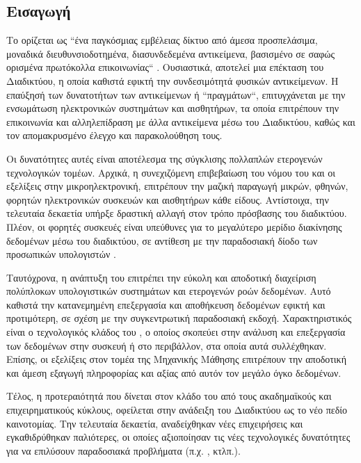 \subsection{Εισαγωγή}
Το  ορίζεται ως ``ένα παγκόσμιας εμβέλειας δίκτυο από άμεσα προσπελάσιμα, μοναδικά διευθυνσιοδοτημένα, διασυνδεδεμένα αντικείμενα, βασισμένο σε σαφώς ορισμένα πρωτόκολλα επικοινωνίας`` \cite{ATZORI20102787}.
Ουσιαστικά, αποτελεί μια επέκταση του Διαδικτύου, η οποία καθιστά εφικτή την συνδεσιμότητά φυσικών αντικείμενων.
Η επαύξησή των δυνατοτήτων των αντικείμενων ή ``πραγμάτων``, επιτυγχάνεται με την ενσωμάτωση ηλεκτρονικών συστημάτων και αισθητήρων, τα οποία επιτρέπουν την επικοινωνία και αλληλεπίδραση με άλλα αντικείμενα μέσω του Διαδικτύου, καθώς και τον απομακρυσμένο έλεγχο και παρακολούθηση τους.
\par
Οι δυνατότητες αυτές είναι αποτέλεσμα της σύγκλισης πολλαπλών ετερογενών τεχνολογικών τομέων.
Αρχικά, η συνεχιζόμενη επιβεβαίωση του νόμου του  και οι εξελίξεις στην μικροηλεκτρονική, επιτρέπουν την μαζική παραγωγή μικρών, φθηνών, φορητών ηλεκτρονικών συσκευών και αισθητήρων κάθε είδους.
Αντίστοιχα, την τελευταία δεκαετία υπήρξε δραστική αλλαγή στον τρόπο πρόσβασης του διαδικτύου.
Πλέον, οι φορητές συσκευές είναι υπεύθυνες για το μεγαλύτερο μερίδιο διακίνησης δεδομένων μέσω του διαδικτύου, σε αντίθεση με την παραδοσιακή δίοδο των προσωπικών υπολογιστών \cite{cisco2019}.
\par
Ταυτόχρονα, η ανάπτυξη του  επιτρέπει την εύκολη και αποδοτική διαχείριση πολύπλοκων υπολογιστικών συστημάτων και ετερογενών ροών δεδομένων.
Αυτό καθιστά την κατανεμημένη επεξεργασία και αποθήκευση δεδομένων εφικτή και προτιμότερη, σε σχέση με την συγκεντρωτική παραδοσιακή εκδοχή.
Χαρακτηριστικός είναι ο τεχνολογικός κλάδος του , ο οποίος σκοπεύει στην ανάλυση και επεξεργασία των δεδομένων στην συσκευή ή στο περιβάλλον, στα οποία αυτά συλλέχθηκαν.
Επίσης, οι εξελίξεις στον τομέα της Μηχανικής Μάθησης επιτρέπουν την αποδοτική και άμεση εξαγωγή πληροφορίας και αξίας από αυτόν τον μεγάλο όγκο δεδομένων.
\par
Τέλος, η προτεραιότητά που δίνεται στον κλάδο του  από τους ακαδημαϊκούς και επιχειρηματικούς κύκλους, οφείλεται στην ανάδειξη του Διαδικτύου ως το νέο πεδίο καινοτομίας.
Την τελευταία δεκαετία, αναδείχθηκαν νέες επιχειρήσεις και εγκαθιδρύθηκαν παλιότερες, οι οποίες αξιοποίησαν τις νέες τεχνολογικές δυνατότητες για να επιλύσουν παραδοσιακά προβλήματα (π.χ. , κτλπ.).
